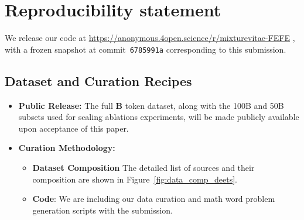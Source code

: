 \section{Reproducibility statement}

We release our code at \url{https://anonymous.4open.science/r/mixturevitae-FEFE}
, with a frozen snapshot at commit~\texttt{6785991a} corresponding to this submission.


\subsection{Dataset and Curation Recipes}


\begin{itemize}
    \item \textbf{Public Release:} The full \DatasetSize{}\textbf{B} token dataset, along with the 100B and 50B subsets used for scaling ablations experiments, will be made publicly available upon acceptance of this paper.
    \item \textbf{Curation Methodology:}
        \begin{itemize}
            \item \textbf{Dataset Composition} The detailed list of sources and their composition are shown in Figure~\ref{fig:data_comp_deets}.
            \item \textbf{Code}: We are including our  data curation and math word problem generation scripts with the submission.
        \end{itemize}
\end{itemize}

